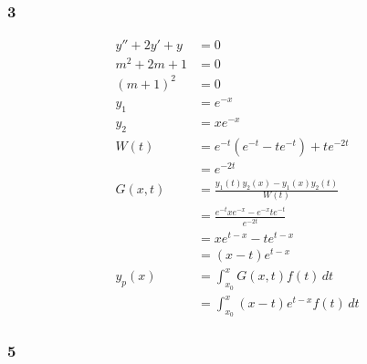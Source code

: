 \documentclass{article}
\begin{document}
\subsubsection{3}

\begin{align*}
  y'' + 2y' + y & = 0                                                 \\
  m^2 + 2m + 1  & = 0                                                 \\
  (m + 1)^2     & = 0                                                 \\
  y_1           & = e^{-x}                                            \\
  y_2           & = x e^{-x}                                          \\
  W(t)          & = e^{-t} (e^{-t} - t e^{-t}) + t e^{-2t}            \\
                & = e^{-2t}                                           \\
  G(x, t)       & = \frac{y_1(t) y_2(x) - y_1(x) y_2(t)}{W(t)}        \\
                & = \frac{e^{-t} x e^{-x} - e^{-x} t e^{-t}}{e^{-2t}} \\
                & = x e^{t - x} - t e^{t - x}                         \\
                & = (x - t) e^{t - x}                                 \\
  y_p(x)        & = \int_{x_0}^x G(x, t) f(t) \,dt                    \\
                & = \int_{x_0}^x (x - t) e^{t - x} f(t) \,dt
\end{align*}

\subsubsection{5}
\end{document}
